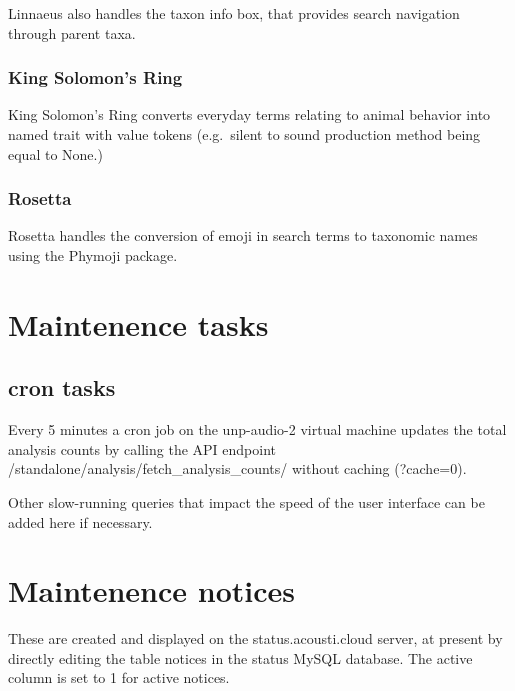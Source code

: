 \documentclass[
]{book}
\begin{document}
Linnaeus also handles the taxon info box, that provides search navigation through parent taxa.

\hypertarget{king-solomons-ring}{%
\subsection{King Solomon's Ring}\label{king-solomons-ring}}

King Solomon's Ring converts everyday terms relating to animal behavior into named trait with value tokens (e.g.~silent to sound production method being equal to None.)

\hypertarget{rosetta}{%
\subsection{Rosetta}\label{rosetta}}

Rosetta handles the conversion of emoji in search terms to taxonomic names using the Phymoji package.

\hypertarget{maintenence-tasks}{%
\chapter{Maintenence tasks}\label{maintenence-tasks}}

\hypertarget{cron-tasks}{%
\section{cron tasks}\label{cron-tasks}}

Every 5 minutes a cron job on the unp-audio-2 virtual machine updates the total analysis counts by calling the API endpoint /standalone/analysis/fetch\_analysis\_counts/ without caching (?cache=0).

Other slow-running queries that impact the speed of the user interface can be added here if necessary.

\hypertarget{maintenence-notices}{%
\chapter{Maintenence notices}\label{maintenence-notices}}

These are created and displayed on the status.acousti.cloud server, at present by directly editing the table notices in the status MySQL database. The active column is set to 1 for active notices.

  
\end{document}
